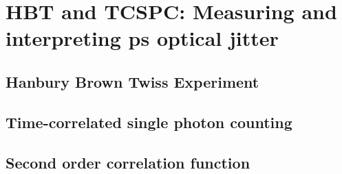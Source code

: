 \section{HBT and TCSPC: Measuring and interpreting ps optical jitter}
\label{sec:Def-Techniques}









\subsection{Hanbury Brown Twiss Experiment}
\subsection{Time-correlated single photon counting}
\subsection{Second order correlation function}